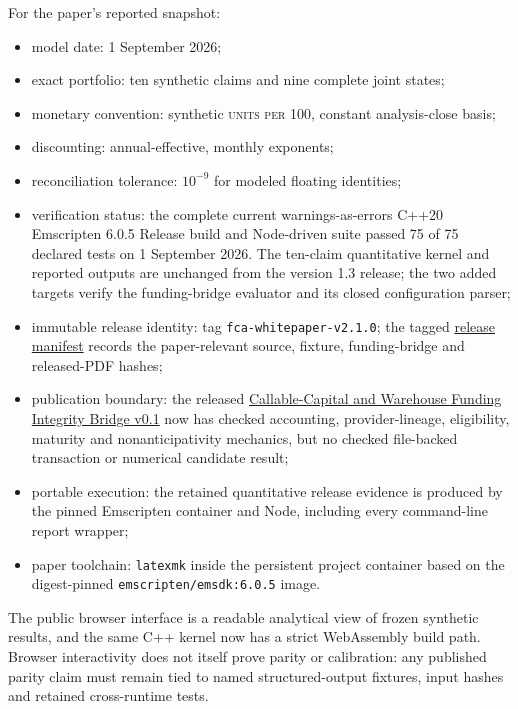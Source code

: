 \documentclass[11pt,a4paper]{article}
\newcommand{\demounit}{\textsc{units per 100}}
\begin{document}
For the paper's reported snapshot:

\begin{itemize}
  \item model date: 1 September 2026;
  \item exact portfolio: ten synthetic claims and nine complete joint states;
  \item monetary convention: synthetic \demounit{}, constant analysis-close basis;
  \item discounting: annual-effective, monthly exponents;
  \item reconciliation tolerance: \(10^{-9}\) for modeled floating identities;
  \item verification status: the complete current warnings-as-errors C++20 Emscripten 6.0.5 Release build and Node-driven suite passed 75 of 75 declared tests on 1 September 2026. The ten-claim quantitative kernel and reported outputs are unchanged from the version 1.3 release; the two added targets verify the funding-bridge evaluator and its closed configuration parser;
  \item immutable release identity: tag \texttt{fca-whitepaper-v2.1.0}; the tagged \href{https://github.com/savethebeesandseeds/naturalehia/blob/fca-whitepaper-v2.1.0/projects/fostering-cellular-agriculture/whitepaper/release-manifest-v2.1.tsv}{release manifest} records the paper-relevant source, fixture, funding-bridge and released-PDF hashes;
  \item publication boundary: the released \href{https://github.com/savethebeesandseeds/naturalehia/blob/fca-whitepaper-v2.1.0/projects/fostering-cellular-agriculture/docs/CALLABLE_CAPITAL_WAREHOUSE_FUNDING_BRIDGE_V0_1.md}{Callable-Capital and Warehouse Funding Integrity Bridge v0.1} now has checked accounting, provider-lineage, eligibility, maturity and nonanticipativity mechanics, but no checked file-backed transaction or numerical candidate result;
  \item portable execution: the retained quantitative release evidence is produced by the pinned Emscripten container and Node, including every command-line report wrapper;
  \item paper toolchain: \texttt{latexmk} inside the persistent project container based on the digest-pinned \texttt{emscripten/emsdk:6.0.5} image.
\end{itemize}

The public browser interface is a readable analytical view of frozen synthetic results, and the same C++ kernel now has a strict WebAssembly build path. Browser interactivity does not itself prove parity or calibration: any published parity claim must remain tied to named structured-output fixtures, input hashes and retained cross-runtime tests.
\end{document}
